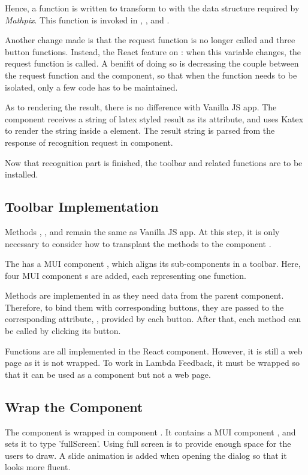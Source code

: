 \documentclass[12pt,twoside]{report}
\begin{document}
Hence, a function  is written to transform 
to   with the data structure required by \textit{Mathpix}. This function is invoked in , ,  and .

Another change made is that the request function is no longer called
 and three button functions. Instead, the React feature
 on : when this variable changes, the request
function is called. A benifit of doing so is decreasing the couple between the
request function and the component, so that when the function needs to be
isolated, only a few code has to be maintained.

As to rendering the result, there is no difference with Vanilla JS app. The
component  receives a string of latex styled result as its
attribute, and uses Katex to render the string inside a  element. The
result string  is parsed from the response of recognition
request in  component.

Now that recognition part is finished, the toolbar and related functions are to be installed. 

\subsection*{Toolbar Implementation}
Methods , ,  and  remain the same as Vanilla JS app. At this step, it is only necessary to consider how to transplant the methods to the component .

The  has a MUI component , which aligns its sub-components in a toolbar. Here, four MUI component s are added, each representing one function.

Methods are implemented in  as they need data from the parent component. Therefore, to bind them with corresponding buttons, they are passed to the corresponding attribute, , provided by each button. After that, each method can be called by clicking its button.

Functions are all implemented in the React component. However, it is still a web page as it is not wrapped. To work in Lambda Feedback, it must be wrapped so that it can be used as a component but not a web page.

\subsection*{Wrap the Component}
The component is wrapped in component . It contains a MUI component , and sets it to type 'fullScreen'. Using full screen is to provide enough space for the users to draw. A slide animation is added when opening the dialog so that it looks more fluent. 
\end{document}
